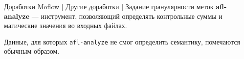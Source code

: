 \documentclass[10pt]{beamer}
\begin{document}


\begin{frame}{Доработки Moflow | Другие доработки | Задание гранулярности меток}
\textbf{afl-analyze} --- инструмент, позволяющий определять контрольные суммы и магические значения во входных файлах.
\begin{figure}[H]
\end{figure}
Данные, для которых \texttt{afl-analyze} не смог определить семантику, помечаются обычным образом.
\end{frame}
\end{document}
